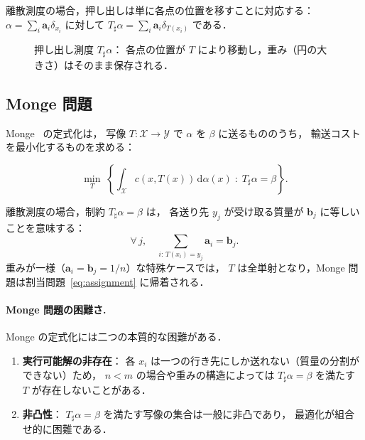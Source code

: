 離散測度の場合，押し出しは単に各点の位置を移すことに対応する：
$\alpha = \sum_i \mathbf{a}_i \delta_{x_i}$ に対して
$T_\sharp \alpha = \sum_i \mathbf{a}_i \delta_{T(x_i)}$
である．

\begin{figure}[htbp]
\centering
{}
\caption{押し出し測度 $T_\sharp \alpha$：
各点の位置が $T$ により移動し，重み（円の大きさ）はそのまま保存される．}
\label{fig:pushforward}
\end{figure}

\subsection{Monge 問題}\label{subsec:monge-problem}

Monge~\cite{Monge1781} の定式化は，
写像 $T : \mathcal{X} \to \mathcal{Y}$ で
$\alpha$ を $\beta$ に送るもののうち，
輸送コストを最小化するものを求める：

\begin{equation}\label{eq:monge}
  \min_{T}\; \left\{
    \int_{\mathcal{X}} c(x, T(x))\, \mathrm{d}\alpha(x)
    \;:\; T_\sharp \alpha = \beta
  \right\}.
\end{equation}

離散測度の場合，制約 $T_\sharp \alpha = \beta$ は，
各送り先 $y_j$ が受け取る質量が $\mathbf{b}_j$ に等しいことを意味する：
\[
  \forall\, j, \quad
  \sum_{i:\, T(x_i)=y_j} \mathbf{a}_i = \mathbf{b}_j.
\]
重みが一様（$\mathbf{a}_i = \mathbf{b}_j = 1/n$）な特殊ケースでは，
$T$ は全単射となり，Monge 問題は割当問題~\eqref{eq:assignment}
に帰着される．

\paragraph{Monge 問題の困難さ.}
Monge の定式化には二つの本質的な困難がある．
\begin{enumerate}
  \item \textbf{実行可能解の非存在}：
    各 $x_i$ は一つの行き先にしか送れない（質量の分割ができない）ため，
    $n < m$ の場合や重みの構造によっては
    $T_\sharp \alpha = \beta$ を満たす $T$ が存在しないことがある．
  \item \textbf{非凸性}：
    $T_\sharp \alpha = \beta$ を満たす写像の集合は一般に非凸であり，
    最適化が組合せ的に困難である．
\end{enumerate}


